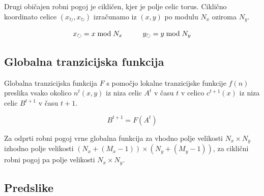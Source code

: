 \documentclass[12pt,a4paper,openany,twoside]{book}
\begin{document}
Drugi običajen robni pogoj je cikličen, kjer je polje celic torus.
Ciklično koordinato celice \((x_{\circlearrowright},x_{\circlearrowright})\) izračunamo iz \((x,y)\) po modulu \(N_x\) oziroma \(N_y\).

\begin{equation}
x_{\circlearrowright} = x \bmod N_x
\hspace{10mm}
y_{\circlearrowright} = y \bmod N_y
\end{equation}

\subsection{Globalna tranzicijska funkcija}

Globalna tranzicijska funkcija \(F\) s pomočjo lokalne tranzicijske funkcije \(f(n)\)
preslika vsako okolico \(n^t(x,y)\) iz niza celic \(A^t\) v času \(t\)
v celico \(c^{t+1}(x)\) iz niza celic \(B^{t+1}\) v času \(t+1\).

\begin{equation}
B^{t+1} = F (A^t)
\end{equation}

Za odprti robni pogoj vrne globalna funkcija za vhodno polje velikosti \(N_x \times N_y\)
izhodno polje velikosti \((N_x+(M_x-1)) \times (N_y+(M_y-1))\),
za ciklični robni pogoj pa polje velikosti \(N_x \times N_y\).

\subsection{Predslike}
\end{document}
